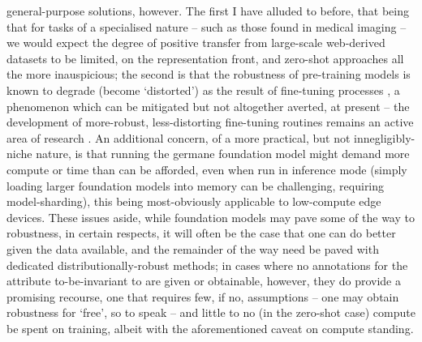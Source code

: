 general-purpose solutions, however. 
%
The first I have alluded to before, that being that for tasks of a specialised nature -- such as
those found in medical imaging -- we would expect the degree of positive transfer from large-scale
web-derived datasets to be limited, on the representation front, and zero-shot approaches all the
more inauspicious; the second is that the robustness of pre-training models is known to degrade
(become `distorted') as the result of fine-tuning processes \citep{andreassen2021evolution,
kumar2022finetuning}, a phenomenon which can be mitigated but not altogether averted, at present --
the development of more-robust, less-distorting fine-tuning routines remains an active area of
research \citep{lee2022surgical, trivedi2023closer}.
%
An additional concern, of a more practical, but not innegligibly-niche nature, is that running the
germane foundation model might demand more compute or time than can be afforded, even when run in
inference mode (simply loading larger foundation models into memory can be challenging, requiring
model-sharding), this being most-obviously applicable to low-compute edge devices.
%
These issues aside, while foundation models may pave some of the way to robustness, in certain
respects, it will often be the case that one can do better given the data available, and the
remainder of the way need be paved with dedicated distributionally-robust methods; in cases where
no annotations for the attribute to-be-invariant to are given or obtainable, however, they do
provide a promising recourse, one that requires few, if no, assumptions -- one may obtain
robustness for `free', so to speak -- and little to no (in the zero-shot case) compute be spent on
training, albeit with the aforementioned caveat on compute standing.

%

